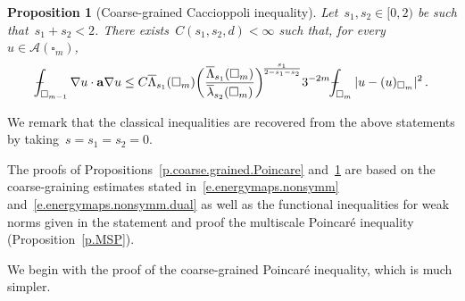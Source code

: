 \documentclass[11pt,twoside]{article} %
\let\oldsquare\square %
\renewcommand{\square}{\oldsquare}
\numberwithin{equation}{section}
\newtheorem{proposition}[theorem]{Proposition}
\theoremstyle{definition}
\renewcommand{\a}{\mathbf{a}}
\newcommand{\cu}{\square}
\def\Xint#1{\mathchoice
{\XXint\displaystyle\textstyle{#1}}%
{\XXint\textstyle\scriptstyle{#1}}%
{\XXint\scriptstyle\scriptscriptstyle{#1}}%
{\XXint\scriptscriptstyle\scriptscriptstyle{#1}}%
\!\int}
\def\XXint#1#2#3{{\setbox0=\hbox{$#1{#2#3}{\int}$}
\vcenter{\hbox{$#2#3$}}\kern-.5\wd0}}
\def\fint{\Xint-}
\newcommand{\A}{\mathcal{A}}
\begin{document}
\begin{proposition}[Coarse-grained Caccioppoli inequality]
\label{p.coarse.grained.Caccioppoli}
Let~$s_1,s_2\in [0,2)$ be such that~$s_1+s_2 < 2$.
There exists~$C(s_1,s_2,d)<\infty$ such that, for every~$u\in\A(\cu_m)$,  
\begin{equation}
\label{e.coarse.grained.Caccioppoli}
\fint_{\cu_{m-1}} 
\nabla u \cdot \a\nabla u
\leq 
C \overline{\Lambda}_{s_1}(\cu_m) 
\biggl( \frac{\overline{\Lambda}_{s_1}(\cu_m)}{\overline{\lambda}_{s_2}(\cu_m)} \biggr)^{\!\frac{s_1}{2-s_1-s_2}}
3^{-2m}  \fint_{\cu_m}  | u-(u)_{\cu_m}|^2 
\,.
\end{equation}
\end{proposition}

We remark that the classical inequalities are recovered from the above statements by taking~$s=s_1=s_2=0$.

\smallskip 

The proofs of Propositions~\ref{p.coarse.grained.Poincare} and~\ref{p.coarse.grained.Caccioppoli} are based on the coarse-graining estimates stated in~\eqref{e.energymaps.nonsymm} and~\eqref{e.energymaps.nonsymm.dual} as well as the functional inequalities for weak norms given in the statement and proof the multiscale Poincar\'e inequality (Proposition~\ref{p.MSP}). 

\smallskip

We begin with the proof of the coarse-grained Poincar\'e inequality, which is much simpler. 
\end{document}
